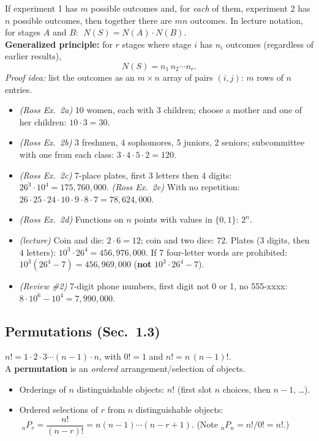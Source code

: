 \documentclass[11pt]{article}
\let\oldsubsection\subsection
\renewcommand{\subsection}{\Needspace{14\baselineskip}\oldsubsection}
\newcommand{\nPr}[2]{{}_{#1}P_{#2}}
\begin{document}
\begin{defbox}
If experiment 1 has $m$ possible outcomes and, for \emph{each} of them, experiment 2 has $n$ possible outcomes, then together there are $mn$ outcomes. In lecture notation, for stages $A$ and $B$: $\;N(S)=N(A)\cdot N(B)$.\\[3pt]
\textbf{Generalized principle:} for $r$ stages where stage $i$ has $n_i$ outcomes (regardless of earlier results),
\[ N(S)=n_1\,n_2\cdots n_r. \]
\emph{Proof idea:} list the outcomes as an $m\times n$ array of pairs $(i,j)$: $m$ rows of $n$ entries.
\end{defbox}

\begin{exbox}[Examples]
\begin{itemize}
\item \emph{(Ross Ex.\ 2a)} 10 women, each with 3 children; choose a mother and one of her children: $10\cdot3=30$.
\item \emph{(Ross Ex.\ 2b)} 3 freshmen, 4 sophomores, 5 juniors, 2 seniors; subcommittee with one from each class: $3\cdot4\cdot5\cdot2=120$.
\item \emph{(Ross Ex.\ 2c)} 7-place plates, first 3 letters then 4 digits: $26^3\cdot10^4=175{,}760{,}000$. \emph{(Ross Ex.\ 2e)} With no repetition: $26\cdot25\cdot24\cdot10\cdot9\cdot8\cdot7=78{,}624{,}000$.
\item \emph{(Ross Ex.\ 2d)} Functions on $n$ points with values in $\{0,1\}$: $2^n$.
\item \emph{(lecture)} Coin and die: $2\cdot6=12$; coin and two dice: $72$. Plates (3 digits, then 4 letters): $10^3\cdot26^4=456{,}976{,}000$. If 7 four-letter words are prohibited: $10^3(26^4-7)=456{,}969{,}000$ (\textbf{not} $10^3\cdot26^4-7$).
\item \emph{(Review \#2)} 7-digit phone numbers, first digit not 0 or 1, no 555-xxxx: $8\cdot10^6-10^4=7{,}990{,}000$.
\end{itemize}
\end{exbox}

\subsection{Permutations (Sec.\ 1.3)}

\begin{defbox}
$n! = 1\cdot2\cdot3\cdots(n-1)\cdot n$, with $0!=1$ and $n! = n\,(n-1)!$.\\[3pt]
A \textbf{permutation} is an \emph{ordered} arrangement/selection of objects.
\begin{itemize}
\item Orderings of $n$ distinguishable objects: $n!$ (first slot $n$ choices, then $n-1$, \dots).
\item Ordered selections of $r$ from $n$ distinguishable objects: $\;\nPr{n}{r} = \dfrac{n!}{(n-r)!}=n(n-1)\cdots(n-r+1)$. (Note $\nPr nn=n!/0!=n!$.)
\end{itemize}
\end{defbox}
\end{document}

